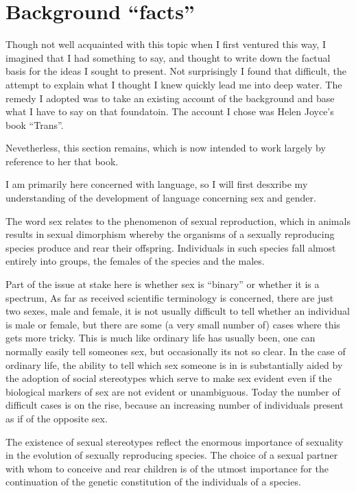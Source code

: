 \documentclass[10pt,titlepage]{book}
\begin{document}
\section{Background ``facts''}

Though not well acquainted with this topic when I first ventured this way, I imagined that I had something to say, and thought to write down the factual basis for the ideas I sought to present.
Not surprisingly I found that difficult, the attempt to explain what I thought I knew quickly lead me into deep water.
The remedy I adopted was to take an existing account of the background and base what I have to say on that foundatoin.
The account I chose was Helen Joyce's book ``Trans''\cite{joyce2021}.

Nevetherless, this section remains, which is now intended to work largely by reference to her that book.

I am primarily here concerned with language, so I will first desxribe my understanding of the development of language concerning sex and gender.

The word sex relates to the phenomenon of sexual reproduction, which in animals results in sexual dimorphism whereby the organisms of a sexually reproducing species produce and rear their offspring.
Individuals in such species fall almost entirely into groups, the females of the species and the males.

Part of the issue at stake here is whether sex is ``binary'' or whether it is a spectrum,
As far as received scientific terminology is concerned, there are just two sexes, male and female, it is not usually difficult to tell whether an individual is male or female, but there are some (a very small number of) cases where this gets more tricky.
This is much like ordinary life has usually been, one can normally easily tell someones sex, but occasionally its not so clear.
In the case of ordinary life, the ability to tell which sex someone is in is substantially aided by the adoption of social stereotypes which serve to make sex evident even if the biological markers of sex are not evident or unambiguous.
Today the number of difficult cases is on the rise, because an increasing number of individuals present as if of the opposite sex.

The existence of sexual stereotypes reflect the enormous importance of sexuality in the evolution of sexually reproducing species.
The choice of a sexual partner with whom to conceive and rear children is of the utmost importance for the continuation of the genetic constitution of the individuals of a species.
\end{document}
